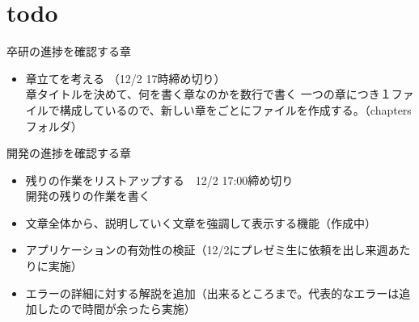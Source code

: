 \documentclass[main]{subfiles}
\begin{document}
\chapter{todo}
\label{cha:intro}
    卒研の進捗を確認する章
\begin{itemize}
    \item 章立てを考える （12/2 17時締め切り）\\
        章タイトルを決めて、何を書く章なのかを数行で書く
        一つの章につき１ファイルで構成しているので、新しい章をごとにファイルを作成する。（chaptersフォルダ）
        
\end{itemize}
開発の進捗を確認する章
    \begin{itemize}
        \item 残りの作業をリストアップする　12/2 17:00締め切り \\
            開発の残りの作業を書く
        \item 文章全体から、説明していく文章を強調して表示する機能（作成中）
        \item アプリケーションの有効性の検証（12/2にプレゼミ生に依頼を出し来週あたりに実施）
        \item エラーの詳細に対する解説を追加（出来るところまで。代表的なエラーは追加したので時間が余ったら実施）
    \end{itemize}
\end{document}

